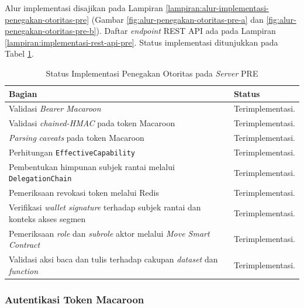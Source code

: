 \documentclass[bahasa, 12pt, a4paper, onecolumn, oneside, final]{report}
\begin{document}
Alur implementasi disajikan pada Lampiran \ref{lampiran:alur-implementasi-penegakan-otoritas-pre} (Gambar \ref{fig:alur-penegakan-otoritas-pre-a} dan \ref{fig:alur-penegakan-otoritas-pre-b}). Daftar \textit{endpoint} REST API ada pada Lampiran \ref{lampiran:implementasi-rest-api-pre}. Status implementasi ditunjukkan pada Tabel \ref{tab:status-implementasi-penegakan-otoritas-pre}.

\begin{table}[!ht]
	\centering
	\caption{Status Implementasi Penegakan Otoritas pada \textit{Server} PRE}
	\label{tab:status-implementasi-penegakan-otoritas-pre}
	\small
	\begin{tabular}{|p{}|p{}|}
		\hline
		\textbf{Bagian}                                                                           & \textbf{Status}  \\ \hline
		Validasi \textit{Bearer Macaroon}                                                         & Terimplementasi. \\ \hline
		Validasi \textit{chained-HMAC} pada token Macaroon                                        & Terimplementasi. \\ \hline
		\textit{Parsing} \textit{caveats} pada token Macaroon                                     & Terimplementasi. \\ \hline
		Perhitungan \texttt{EffectiveCapability}                                                  & Terimplementasi. \\ \hline
		Pembentukan himpunan subjek rantai melalui \texttt{DelegationChain}                       & Terimplementasi. \\ \hline
		Pemeriksaan revokasi token melalui Redis                                                  & Terimplementasi. \\ \hline
		Verifikasi \textit{wallet signature} terhadap subjek rantai dan konteks akses segmen      & Terimplementasi. \\ \hline
		Pemeriksaan \textit{role} dan \textit{subrole} aktor melalui \textit{Move Smart Contract} & Terimplementasi. \\ \hline
		Validasi aksi baca dan tulis terhadap cakupan \textit{dataset} dan \textit{function}      & Terimplementasi. \\ \hline
	\end{tabular}
\end{table}

\subsubsection{Autentikasi Token Macaroon}
\label{subsec:autentikasi-token-macaroon}
\end{document}
